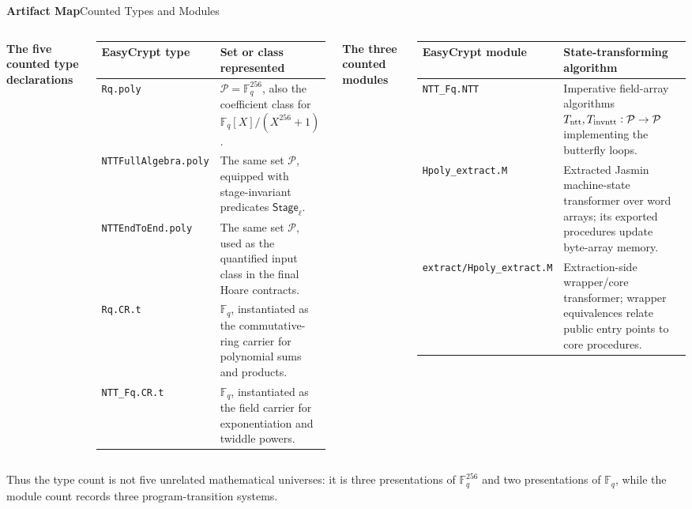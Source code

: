 \documentclass[10pt,aspectratio=1610,compress,dvipsnames]{beamer}
\newcommand{\ec}[1]{\texttt{#1}}
\begin{document}
\begin{frame}{\bfseries Artifact Map}{Counted Types and Modules}
\tiny
\begin{columns}[T]
\textbf{The five counted type declarations}
\vspace{2pt}
\begin{center}
\renewcommand{\arraystretch}{1.14}
\setlength{\tabcolsep}{2pt}
\begin{tabular}{p{2.35cm}p{3.85cm}}
\toprule[1.1pt]
\textbf{EasyCrypt type} & \textbf{Set or class represented} \\
\midrule
\ec{Rq.poly} &
$\mathcal P=\mathbb F_q^{256}$, also the coefficient class for
$\mathbb F_q[X]/(X^{256}+1)$. \\
\ec{NTTFullAlgebra.poly} &
The same set $\mathcal P$, equipped with stage-invariant predicates
$\mathsf{Stage}_\ell$. \\
\ec{NTTEndToEnd.poly} &
The same set $\mathcal P$, used as the quantified input class in the final
Hoare contracts. \\
\ec{Rq.CR.t} &
$\mathbb F_q$, instantiated as the commutative-ring carrier for polynomial
sums and products. \\
\ec{NTT\_Fq.CR.t} &
$\mathbb F_q$, instantiated as the field carrier for exponentiation and
twiddle powers. \\
\bottomrule[1.1pt]
\end{tabular}
\end{center}

\textbf{The three counted modules}
\vspace{2pt}
\begin{center}
\renewcommand{\arraystretch}{1.14}
\setlength{\tabcolsep}{2pt}
\begin{tabular}{p{2.55cm}p{3.15cm}}
\toprule[1.1pt]
\textbf{EasyCrypt module} & \textbf{State-transforming algorithm} \\
\midrule
\ec{NTT\_Fq.NTT} &
Imperative field-array algorithms
$T_{\rm ntt},T_{\rm invntt}:\mathcal P\to\mathcal P$ implementing the
butterfly loops. \\
\ec{Hpoly\_extract.M} &
Extracted Jasmin machine-state transformer over word arrays; its exported
procedures update byte-array memory. \\
\ec{extract/Hpoly\_extract.M} &
Extraction-side wrapper/core transformer; wrapper equivalences relate public
entry points to core procedures. \\
\bottomrule[1.1pt]
\end{tabular}
\end{center}
\end{columns}

\vspace{3pt}
\begin{center}
\scriptsize
Thus the type count is not five unrelated mathematical universes: it is
three presentations of $\mathbb F_q^{256}$ and two presentations of
$\mathbb F_q$, while the module count records three program-transition
systems.
\end{center}
\end{frame}
\end{document}
